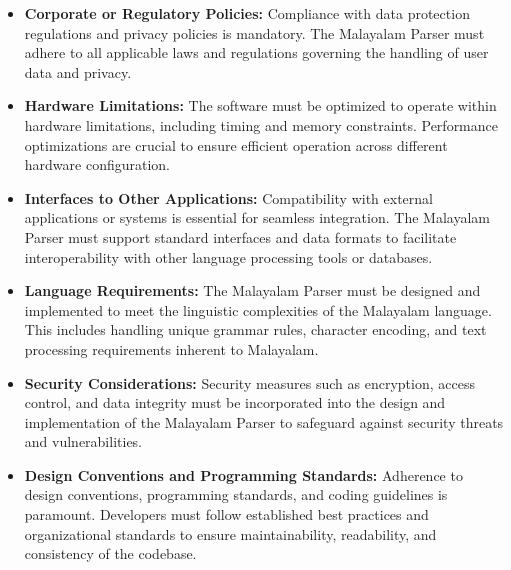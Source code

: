 \documentclass[12pt]{article}
\begin{document}
	\begin{itemize}[label=-]
		\item \textbf{Corporate or Regulatory Policies:} Compliance with data protection regulations
		and privacy policies is mandatory. The Malayalam Parser must adhere to all
		applicable laws and regulations governing the handling of user data and privacy.
		\item \textbf{Hardware Limitations:} The software must be optimized to operate within
		hardware limitations, including timing and memory constraints. Performance
		optimizations are crucial to ensure efficient operation across different hardware
		configuration.
		\item \textbf{Interfaces to Other Applications:} Compatibility with external applications or
		systems is essential for seamless integration. The Malayalam Parser must support
		standard interfaces and data formats to facilitate interoperability with other
		language processing tools or databases.
		\item \textbf{Language Requirements:} The Malayalam Parser must be designed and
		implemented to meet the linguistic complexities of the Malayalam language. This
		includes handling unique grammar rules, character encoding, and text processing
		requirements inherent to Malayalam.
		\item \textbf{Security Considerations:} Security measures such as encryption, access control,
		and data integrity must be incorporated into the design and implementation of the
		Malayalam Parser to safeguard against security threats and vulnerabilities.
		\item \textbf{Design Conventions and Programming Standards:} Adherence to design
		conventions, programming standards, and coding guidelines is paramount.
		Developers must follow established best practices and organizational standards to
		ensure maintainability, readability, and consistency of the codebase.
	\end{itemize}
	
\end{document}
